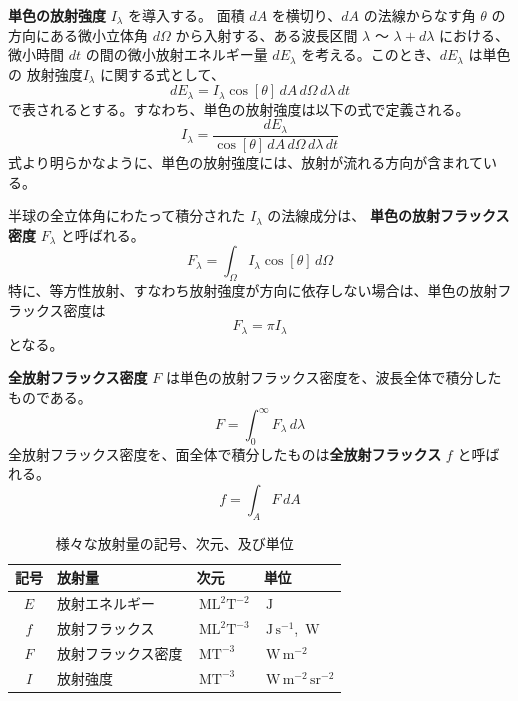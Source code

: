 \documentclass[book]{dennou777}
\newcommand{\hmunit}[1]{\,\mathrm{#1}}
\newcommand{\hmemph}[1]{\textbf{#1}}
\begin{document}
\hmemph{単色の放射強度} $I_\lambda$ を導入する。
面積 $dA$ を横切り、$dA$ の法線からなす角 $\theta$ の方向にある微小立体角 $d\Omega$
から入射する、ある波長区間 $\lambda$ 〜 $\lambda+d\lambda$ における、微小時間 $dt$
の間の微小放射エネルギー量 $dE_\lambda$ を考える。このとき、$dE_\lambda$ は単色の
放射強度$I_\lambda$ に関する式として、
\begin{equation}
	dE_\lambda=I_\lambda\cos[\theta]\,dA\,d\Omega\,d\lambda\,dt
\end{equation}
で表されるとする。すなわち、単色の放射強度は以下の式で定義される。
\begin{equation}
	I_\lambda=\frac{dE_\lambda}{\cos[\theta]\,dA\,d\Omega\,d\lambda\,dt}
\end{equation}
式より明らかなように、単色の放射強度には、放射が流れる方向が含まれている。

半球の全立体角にわたって積分された $I_\lambda$ の法線成分は、
\hmemph{単色の放射フラックス密度} $F_\lambda$ と呼ばれる。
\begin{equation}
	F_\lambda=\int_\Omega I_\lambda\cos[\theta]\,d\Omega
\end{equation}
特に、等方性放射、すなわち放射強度が方向に依存しない場合は、単色の放射フラックス密度は
\begin{equation}
	F_\lambda=\pi I_\lambda
\end{equation}
となる。

\hmemph{全放射フラックス密度} $F$ は単色の放射フラックス密度を、波長全体で積分したものである。
\begin{equation}
	F=\int^\infty_0 F_\lambda\,d\lambda
\end{equation}
全放射フラックス密度を、面全体で積分したものは\hmemph{全放射フラックス} $f$ と呼ばれる。
\begin{equation}
	f=\int_AF\,dA
\end{equation}

\begin{table}[t]
	\caption{様々な放射量の記号、次元、及び単位}
	\centering
	\begin{tabular}{clll}
		\hline
		記号&放射量&次元&単位\\
		\hline\hline
		$E$&放射エネルギー&$\hmunit{ML^2T^{-2}}$&$\hmunit{J}$\\
		$f$&放射フラックス&$\hmunit{ML^2T^{-3}}$&$\hmunit{J\,s^{-1}}$, $\hmunit{W}$\\
		$F$&放射フラックス密度&$\hmunit{MT^{-3}}$&$\hmunit{W\,m^{-2}}$\\
		$I$&放射強度&$\hmunit{MT^{-3}}$&$\hmunit{W\,m^{-2}\,sr^{-2}}$\\
		\hline
	\end{tabular}
\end{table}
\end{document}
